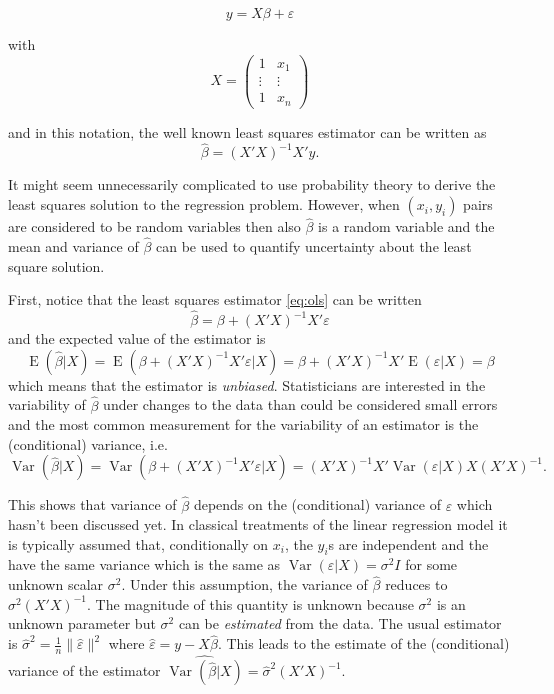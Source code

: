 \documentclass[final,leqno]{siamltex1213}
\DeclareMathOperator{\E}{E}
\DeclareMathOperator{\Var}{Var}
\begin{document}
\begin{equation}
\label{eq:linreg}
    y = X\beta + \varepsilon
\end{equation}

with
\begin{equation*}
    X = \begin{pmatrix}
        1 & x_1\\
        \vdots & \vdots \\
        1 & x_n
    \end{pmatrix}
\end{equation*}

and in this notation, the well known least squares estimator can be written as
\begin{equation}
\label{eq:ols}
    \hat{\beta} = (X'X)^{-1}X'y.
\end{equation}

It might seem unnecessarily complicated to use probability theory to derive the least squares solution to the regression problem. However, when $(x_i,y_i)$ pairs are considered to be random variables then also $\hat{\beta}$ is a random variable and the mean and variance of $\hat{\beta}$ can be used to quantify uncertainty about the least square solution.

First, notice that the least squares estimator \eqref{eq:ols} can be written
\begin{equation*}
    \hat{\beta} = \beta + (X'X)^{-1}X'\varepsilon
\end{equation*}
and the expected value of the estimator is
\begin{equation}
    \E(\hat{\beta}|X) = \E(\beta + (X'X)^{-1}X'\varepsilon|X) =
        \beta + (X'X)^{-1}X'\E(\varepsilon|X) = \beta
\end{equation}
which means that the estimator is \emph{unbiased}. Statisticians are interested in the variability of $\hat{\beta}$ under changes to the data than could be considered small errors and the most common measurement for the variability of an estimator is the (conditional) variance, i.e.
\begin{equation*}
    \Var(\hat{\beta}|X) = \Var(\beta + (X'X)^{-1}X'\varepsilon|X) =
        (X'X)^{-1}X'\Var(\varepsilon|X)X(X'X)^{-1}.
\end{equation*}

This shows that variance of $\hat{\beta}$ depends on the (conditional) variance of $\varepsilon$ which hasn't been discussed yet. In classical treatments of the linear regression model it is typically assumed that, conditionally on $x_i$, the $y_i$s are independent and the have the same variance which is the same as $\Var(\varepsilon|X)=\sigma^2 I$ for some unknown scalar $\sigma^2$. Under this assumption, the variance of $\hat{\beta}$ reduces to $\sigma^2 (X'X)^{-1}$. The magnitude of this quantity is unknown because $\sigma^2$ is an unknown parameter but $\sigma^2$ can be \emph{estimated} from the data. The usual estimator is $\hat{\sigma}^2=\frac{1}{n} \|\hat{\varepsilon}\|^2$ where $\hat{\varepsilon} = y - X\hat{\beta}$. This leads to the estimate of the (conditional) variance of the estimator $\widehat{\Var(\hat{\beta}|X)} = \hat{\sigma}^2(X'X)^{-1}$.
\end{document}
